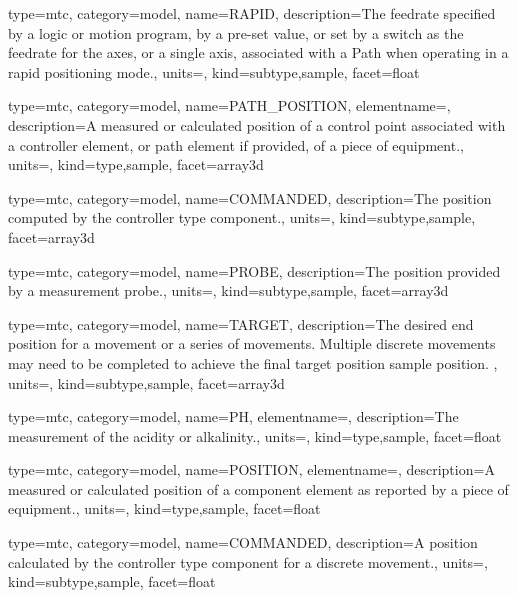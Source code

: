 {
  type=mtc,
  category=model,
  name={RAPID},
  description={The feedrate specified by a logic or motion program, by a pre-set value, or set by a switch as the feedrate for the axes, or a single axis, associated with a Path when operating in a rapid positioning mode.},
  units=,
  kind={subtype,sample},
  facet={\gls{float}}
}


{
  type=mtc,
  category=model,
  name={PATH\_POSITION},
  elementname=,
  description={A measured or calculated position of a control point associated with a \gls{controller} element, or \gls{path} element if provided, of a piece of equipment.},
  units=,
  kind={type,sample},
  facet={\gls{array3d}}
}


{
  type=mtc,
  category=model,
  name={COMMANDED},
  description={The position computed by the \gls{controller} type component.},
  units=,
  kind={subtype,sample},
  facet={\gls{array3d}}
}


{
  type=mtc,
  category=model,
  name={PROBE},
  description={The position provided by a measurement probe.},
  units=,
  kind={subtype,sample},
  facet={\gls{array3d}}
}


{
  type=mtc,
  category=model,
  name={TARGET},
  description={The desired end position for a movement or a series of movements. Multiple discrete movements may need to be completed to achieve the final \gls{target position sample} position.  },
  units=,
  kind={subtype,sample},
  facet={\gls{array3d}}
}


{
  type=mtc,
  category=model,
  name={PH},
  elementname=,
  description={The measurement of the acidity or alkalinity.},
  units=,
  kind={type,sample},
  facet={\gls{float}}
}


{
  type=mtc,
  category=model,
  name={POSITION},
  elementname=,
  description={A measured or calculated position of a \gls{component} element as reported by a piece of equipment.},
  units=,
  kind={type,sample},
  facet={\gls{float}}
}


{
  type=mtc,
  category=model,
  name={COMMANDED},
  description={A position calculated by the \gls{controller} type component for a discrete movement.},
  units=,
  kind={subtype,sample},
  facet={\gls{float}}
}


